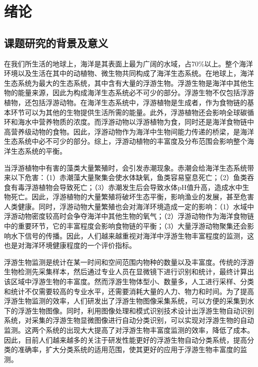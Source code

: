 \chapter{绪论}
\label{cha:intro}


\section{课题研究的背景及意义}

在我们所生活的地球上，海洋是其表面上最为广阔的水域，占70\%以上。整个海洋环境以及生活在其中的动植物、微生物共同构成了海洋生态系统。在地球上，海洋生态系统为最大的生态系统，其中含有大量的浮游生物。浮游生物是海洋中其他生物的能量来源，因此为构成海洋生态系统必不可少的部分。浮游生物不仅包括浮游植物，还包括浮游动物。在海洋生态系统中，浮游植物是生成者，作为食物链的基本环节可以为其他的生物提供生活所需的能量。此外，浮游植物还会影响全球碳循环和海水中营养物质的浓度。而浮游动物以浮游植物为食，同时还是海洋食物链中高营养级动物的食物。因此，浮游动物作为海洋中生物间能力传递的桥梁，是海洋生态系统中必不可少的部分。综上，浮游动植物的丰富度及分布范围会影响整个海洋生态系统的平衡。

当浮游植物中有害的藻类大量繁殖时，会引发赤潮现象。赤潮会给海洋生态系统带来以下危害：（1）赤潮藻大量聚集会使水体缺氧，鱼类容易窒息死亡；（2）鱼类吞食有毒浮游植物会导致死亡；（3）赤潮发生后会导致水体pH值升高，造成水中生物死亡。因此，浮游植物的大量繁殖将破坏生态平衡，影响渔业的发展，甚至危害人类健康。同时，浮游动物大量繁殖也会对海洋环境造成一定的影响：（1）水域中浮游动物密度较高时会争夺海洋中其他生物的氧气；（2）浮游动物作为海洋食物链中的重要环节，它的丰富程度会影响食物链的平衡；（3）大量浮游动物聚集还会影响水下信号的传播。因此，人们越来越重视对海洋中浮游生物丰富程度的监测，这也是对海洋环境健康程度的一个评价指标。

浮游生物监测是统计在某一时间和空间范围内物种的数量以及丰富度。传统的浮游生物检测先采集样本，然后通过专业人员在显微镜下进行识别和统计，最终计算出该区域中浮游生物的丰富度。然而浮游生物体型小、数量多，人工进行采样、分类和统计不仅需要较高的专业水平，还需要消耗大量的人力、物力和时间。为了提高浮游生物监测的效率，人们研发出了浮游生物图像采集系统，可以方便的采集到水下的浮游生物图像。同时，利用图像处理和模式识别技术设计出浮游生物自动识别系统，对采集的浮游生物显微图像进行自动分类识别，可以实现对浮游生物的自动监测。这两个系统的出现大大提高了对浮游生物丰富度监测的效率，降低了成本。因此，目前人们越来越多的关注于研发性能更好的浮游生物自动分类系统，提高分类的准确率，扩大分类系统的适用范围，使其更好的应用于浮游生物丰富度的监测。



